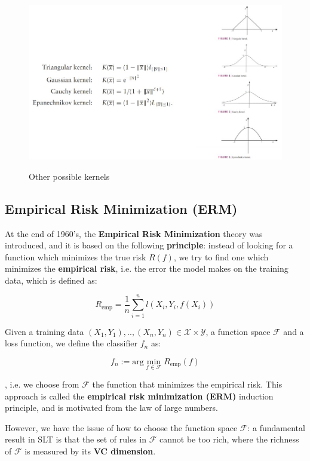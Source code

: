 \begin{figure}[h!]
		\centering
        \includegraphics[scale = 1.2]{img/different kernels.jpg}
		\label{different kernels}
        \caption{Other possible kernels}
\end{figure}

\subsection{Empirical Risk Minimization (ERM)}
At the end of 1960's, the \textbf{Empirical Risk Minimization} theory was introduced, and it is based on the following \textbf{principle}: instead of looking for a function which minimizes the true risk $R(f)$, we try to find one which minimizes the \textbf{empirical risk}, i.e. the error the model makes on the training data, which is defined as:

$$
R_{\text{emp}} = \frac{1}{n} \sum_{i = 1}^n l(X_i, Y_i, f(X_i))
$$

Given a training data $(X_1, Y_1), .., (X_n, Y_n) \in \mathcal{X} \times \mathcal{Y}$, a function space $\mathcal{F}$ and a loss function, we define the classifier $f_n$ as:

$$
f_n := \text{arg} \min_{f \in \mathcal{F}} R_{\text{emp}}(f)
$$

, i.e. we choose from $\mathcal{F}$ the function that minimizes the empirical risk. This approach is called the \textbf{empirical risk minimization (ERM)} induction principle, and is motivated from the law of large numbers.

However, we have the issue of how to choose the function space $\mathcal{F}$: a fundamental result in SLT is that the set of rules in $\mathcal{F}$ cannot be too rich, where the richness of $\mathcal{F}$ is measured by its \textbf{VC dimension}.

